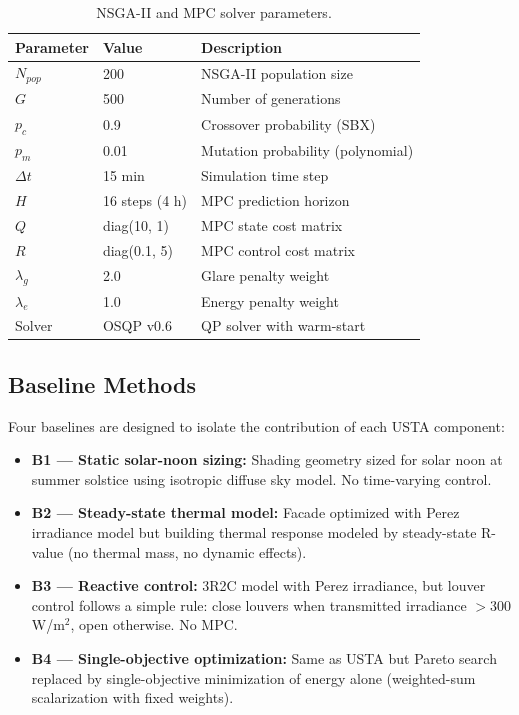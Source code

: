 \documentclass[5p,times,twocolumn]{elsarticle}
\begin{document}
\begin{table}[!t]
\centering
\footnotesize
\caption{NSGA-II and MPC solver parameters.}
\label{tab:solver}
\begin{tabularx}{\columnwidth}{@{} l l >{\raggedright\arraybackslash}X @{}}
\toprule
\textbf{Parameter} & \textbf{Value} & \textbf{Description} \\
\midrule
$N_{pop}$ & 200 & NSGA-II population size \\
$G$ & 500 & Number of generations \\
$p_c$ & 0.9 & Crossover probability (SBX) \\
$p_m$ & 0.01 & Mutation probability (polynomial) \\
$\Delta t$ & 15 min & Simulation time step \\
$H$ & 16 steps (4 h) & MPC prediction horizon \\
$Q$ & diag(10, 1) & MPC state cost matrix \\
$R$ & diag(0.1, 5) & MPC control cost matrix \\
$\lambda_g$ & 2.0 & Glare penalty weight \\
$\lambda_e$ & 1.0 & Energy penalty weight \\
Solver & OSQP v0.6 & QP solver with warm-start \\
\bottomrule
\end{tabularx}
\end{table}

\subsection{Baseline Methods}

Four baselines are designed to isolate the contribution of each USTA component:

\begin{itemize}
\item \textbf{B1 --- Static solar-noon sizing:} Shading geometry sized for solar noon at summer solstice using isotropic diffuse sky model. No time-varying control.

\item \textbf{B2 --- Steady-state thermal model:} Facade optimized with Perez irradiance model but building thermal response modeled by steady-state R-value (no thermal mass, no dynamic effects).

\item \textbf{B3 --- Reactive control:} 3R2C model with Perez irradiance, but louver control follows a simple rule: close louvers when transmitted irradiance $> 300$ W/m$^2$, open otherwise. No MPC.

\item \textbf{B4 --- Single-objective optimization:} Same as USTA but Pareto search replaced by single-objective minimization of energy alone (weighted-sum scalarization with fixed weights).
\end{itemize}
\end{document}
